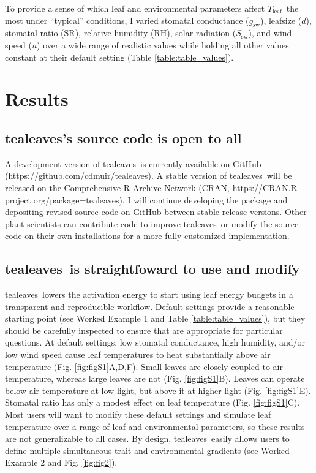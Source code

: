\documentclass[11pt, oneside]{article}
\newcommand{\pkg}[1]{{\fontseries{b}\selectfont #1}}
\newcommand{\tealeaves}{\pkg{tealeaves}}
\newcommand{\tleaf}{$T_\mathrm{leaf}$}
\begin{document}
To provide a sense of which leaf and environmental parameters affect \tleaf~the most under ``typical'' conditions, I varied stomatal conductance ($g_\mathrm{sw}$), leafsize ($d$), stomatal ratio ($\mathrm{SR}$), relative humidity ($\mathrm{RH}$), solar radiation ($S_\mathrm{sw}$), and wind speed ($u$) over a wide range of realistic values while holding all other values constant at their default setting (Table \ref{table:table_values}).

\section*{Results}

\subsection*{\tealeaves's source code is open to all}

A development version of \tealeaves~is currently available on GitHub (https://github.com/cdmuir/tealeaves). A stable version of \tealeaves~will be released on the Comprehensive R Archive Network (CRAN, https://CRAN.R-project.org/package=tealeaves). I will continue developing the package and depositing revised source code on GitHub between stable release versions. Other plant scientists can contribute code to improve \tealeaves~or modify the source code on their own installations for a more fully customized implementation. 

\subsection*{\tealeaves~is straightfoward to use and modify}

\tealeaves~lowers the activation energy to start using leaf energy budgets in a transparent and reproducible workflow. Default settings provide a reasonable starting point (see Worked Example 1 and Table \ref{table:table_values}), but they should be carefully inspected to ensure that are appropriate for particular questions. At default settings, low stomatal conductance, high humidity, and/or low wind speed cause leaf temperatures to heat substantially above air temperature (Fig. \ref{fig:figS1}A,D,F). Small leaves are closely coupled to air temperature, whereas large leaves are not (Fig. \ref{fig:figS1}B). Leaves can operate below air temperature at low light, but above it at higher light (Fig. \ref{fig:figS1}E). Stomatal ratio has only a modest effect on leaf temperature (Fig. \ref{fig:figS1}C). Most users will want to modify these default settings and simulate leaf temperature over a range of leaf and environmental parameters, so these results are not generalizable to all cases. By design, \tealeaves~easily allows users to define multiple simultaneous trait and environmental gradients (see Worked Example 2 and Fig. \ref{fig:fig2}).
\end{document}
